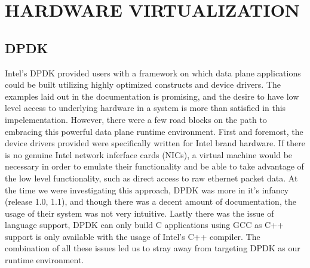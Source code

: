 \chapter{HARDWARE VIRTUALIZATION}
\label{hardware}


\section{DPDK}
\label{invest:dpdk}
Intel's DPDK provided users with a framework on which data plane applications
could be built utilizing highly optimized constructs and device drivers. The
examples laid out in the documentation is promising, and the desire to have
low level access to underlying hardware in a system is more than satisfied
in this impelementation. However, there were a few road blocks on the path to
embracing this powerful data plane runtime environment. First and foremost, the
device drivers provided were specifically written for Intel brand hardware. If
there is no genuine Intel network inferface cards (NICs), a virtual machine
would be necessary in order to emulate their functionality and be able to take
advantage of the low level functionality, such as direct access to raw
ethernet packet data. At the time we were investigating this approach, DPDK was
more in it's infancy (release 1.0, 1.1), and though there was a decent amount
of documentation, the usage of their system was not very intuitive. Lastly
there was the issue of language support, DPDK can only build C applications
using GCC as C++ support is only available with the usage of Intel's C++
compiler. The combination of all these issues led us to stray away from
targeting DPDK as our runtime environment.
